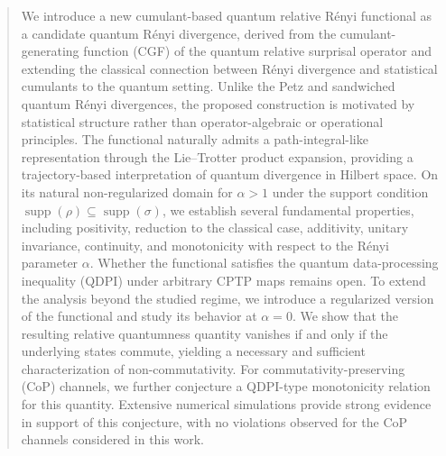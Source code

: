 \documentclass[a4paper, amsfonts, amssymb, amsmath, reprint, showkeys, nofootinbib, twoside, aps, pra]{revtex4-2}
\theoremstyle{definition}
\begin{document}
\begin{abstract}
We introduce a new cumulant-based quantum relative Rényi functional as a candidate quantum Rényi divergence, derived from the cumulant-generating function (CGF) of the quantum relative surprisal operator and extending the classical connection between Rényi divergence and statistical cumulants to the quantum setting. Unlike the Petz and sandwiched quantum Rényi divergences, the proposed construction is motivated by statistical structure rather than operator-algebraic or operational principles. The functional naturally admits a path-integral-like representation through the Lie–Trotter product expansion, providing a trajectory-based interpretation of quantum divergence in Hilbert space. On its natural non-regularized domain for $\alpha>1$ under the support condition $\operatorname{supp}(\rho)\subseteq\operatorname{supp}(\sigma)$, we establish several fundamental properties, including positivity, reduction to the classical case, additivity, unitary invariance, continuity, and monotonicity with respect to the Rényi parameter $\alpha$. Whether the functional satisfies the quantum data-processing inequality (QDPI) under arbitrary CPTP maps remains open. To extend the analysis beyond the studied regime, we introduce a regularized version of the functional and study its behavior at $\alpha=0$. We show that the resulting relative quantumness quantity vanishes if and only if the underlying states commute, yielding a necessary and sufficient characterization of non-commutativity. For commutativity-preserving (CoP) channels, we further conjecture a QDPI-type monotonicity relation for this quantity. Extensive numerical simulations provide strong evidence in support of this conjecture, with no violations observed for the CoP channels considered in this work.


\end{abstract}

\maketitle
\end{document}
